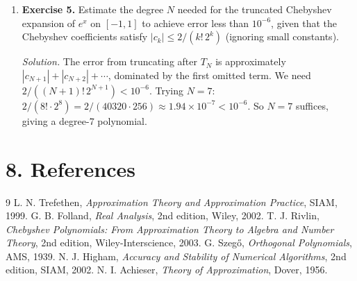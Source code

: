 \begin{enumerate}[leftmargin=*,itemsep=0.9em]
\item \textbf{Exercise 5.} Estimate the degree $N$ needed for the truncated Chebyshev expansion of $e^x$ on $[-1,1]$ to achieve error less than $10^{-6}$, given that the Chebyshev coefficients satisfy $|c_k|\le 2/(k!\,2^k)$ (ignoring small constants).

\emph{Solution.} The error from truncating after $T_N$ is approximately $|c_{N+1}|+|c_{N+2}|+\cdots$, dominated by the first omitted term. We need $2/((N+1)!\,2^{N+1})<10^{-6}$. Trying $N=7$: $2/(8!\cdot 2^8)=2/(40320\cdot 256)\approx 1.94\times 10^{-7}<10^{-6}$. So $N=7$ suffices, giving a degree-7 polynomial.

\end{enumerate}
\section*{8. References}
\begin{thebibliography}{9}
 L. N. Trefethen, \emph{Approximation Theory and Approximation Practice}, SIAM, 1999.
 G. B. Folland, \emph{Real Analysis}, 2nd edition, Wiley, 2002.
 T. J. Rivlin, \emph{Chebyshev Polynomials: From Approximation Theory to Algebra and Number Theory}, 2nd edition, Wiley-Interscience, 2003.
 G. Szegő, \emph{Orthogonal Polynomials}, AMS, 1939.
 N. J. Higham, \emph{Accuracy and Stability of Numerical Algorithms}, 2nd edition, SIAM, 2002.
 N. I. Achieser, \emph{Theory of Approximation}, Dover, 1956.
\end{thebibliography}
